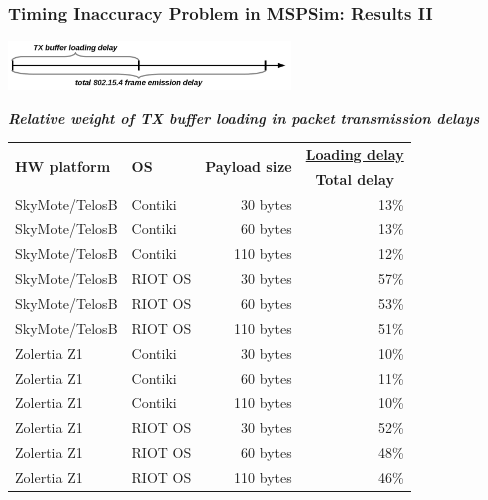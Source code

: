 \documentclass[10pt,c]{beamer}
\newcommand{\tblcaption}[1]{\textbf{\textsl{\small#1}}\vspace{0.1cm}}
\begin{document}
\begin{frame}
\frametitle{Timing Inaccuracy Problem in MSPSim: Results II}
\begin{center}
\vspace{-0.4cm}
\includegraphics[width=7.5cm]{Delays.png}
\vspace{0.1cm}

\tblcaption{\small Relative weight of TX buffer loading
            in packet transmission delays}
\small
\begin{tabular}{|l|l|r|r|}
\hline
\multirow{2}{2.5cm}{\textbf{HW platform}}
 & \multirow{2}{1cm}{\textbf{OS}}
  & \multirow{2}{2cm}{\textbf{Payload size}}
     & \multicolumn{1}{|c|}{\textbf{\underline{Loading delay}}} \\
 & & & \multicolumn{1}{|c|}{\textbf{Total delay}} \\
\hline
SkyMote/TelosB & Contiki &  30 bytes & 13\% \\
SkyMote/TelosB & Contiki &  60 bytes & 13\% \\
SkyMote/TelosB & Contiki & 110 bytes & 12\% \\
\hline
SkyMote/TelosB & RIOT OS &  30 bytes & 57\% \\
SkyMote/TelosB & RIOT OS &  60 bytes & 53\% \\
SkyMote/TelosB & RIOT OS & 110 bytes & 51\% \\
\hline
Zolertia Z1    & Contiki &  30 bytes & 10\% \\
Zolertia Z1    & Contiki &  60 bytes & 11\% \\
Zolertia Z1    & Contiki & 110 bytes & 10\% \\
\hline
Zolertia Z1    & RIOT OS &  30 bytes & 52\% \\
Zolertia Z1    & RIOT OS &  60 bytes & 48\% \\
Zolertia Z1    & RIOT OS & 110 bytes & 46\% \\
\hline
\end{tabular}
\end{center}
\end{frame}
\end{document}
